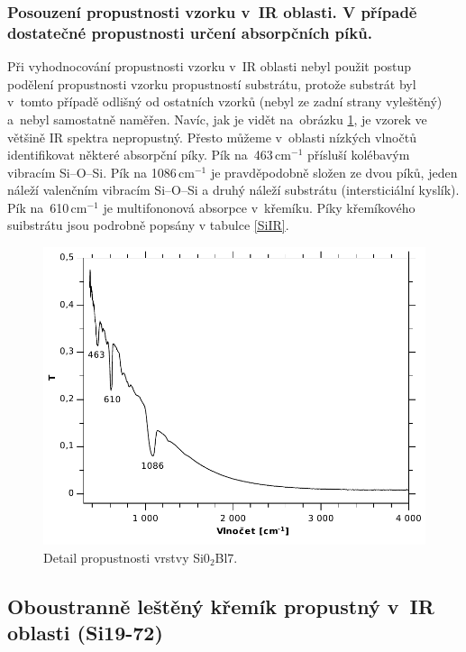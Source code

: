 \documentclass[12pt]{article}
\begin{document}
\subsubsection{Posouzení propustnosti vzorku v~IR oblasti. V případě dostatečné propustnosti určení absorpčních píků. }
Při vyhodnocování propustnosti vzorku v~IR oblasti nebyl použit postup podělení propustnosti vzorku propustností substrátu, protože substrát byl v~tomto případě odlišný od ostatních vzorků (nebyl ze zadní strany vyleštěný) a~nebyl samostatně naměřen. Navíc, jak je vidět na~obrázku \ref{Sio2T}, je vzorek ve většině IR spektra nepropustný. Přesto můžeme v~oblasti nízkých vlnočtů identifikovat některé absorpční píky. Pík na~463\,cm$^{-1}$ přísluší kolébavým vibracím Si--O--Si. Pík na 1086\,cm$^{-1}$ je pravděpodobně složen ze dvou píků, jeden náleží valenčním vibracím Si--O--Si a druhý náleží substrátu (intersticiální kyslík). Pík na~610\,cm$^{-1}$ je multifononová absorpce v~křemíku. Píky křemíkového suibstrátu jsou podrobně popsány v tabulce \ref{SiIR}.

\begin{figure}
  \centering
  \includegraphics[width=130mm]{img/Sio2-T.pdf}
  \caption{Detail propustnosti vrstvy Si0$_2$Bl7.}
  \label{Sio2T}
\end{figure}





\subsection{Oboustranně leštěný křemík propustný v~IR oblasti (Si19-72) }
\end{document}
